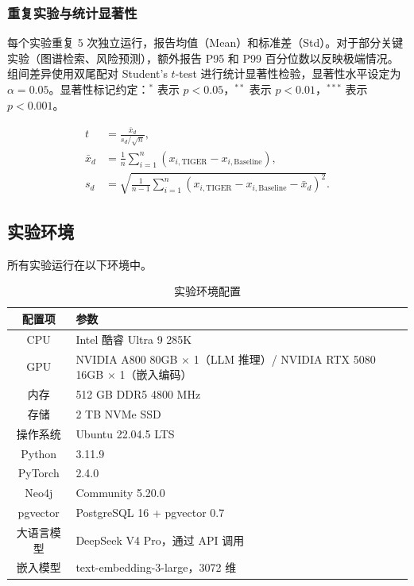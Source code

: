 \documentclass[12pt,a4paper]{article}
\begin{document}
\subsubsection{重复实验与统计显著性}

每个实验重复 5 次独立运行，报告均值（Mean）和标准差（Std）。对于部分关键实验（图谱检索、风险预测），额外报告 P95 和 P99 百分位数以反映极端情况。组间差异使用双尾配对 Student's $t$-test 进行统计显著性检验，显著性水平设定为 $\alpha=0.05$。显著性标记约定：$^{\ast}$ 表示 $p < 0.05$，$^{\ast\ast}$ 表示 $p < 0.01$，$^{\ast\ast\ast}$ 表示 $p < 0.001$。

\begin{align}
t &= \frac{\bar{x}_d}{s_d / \sqrt{n}}, \\[0.3em]
\bar{x}_d &= \frac{1}{n}\sum_{i=1}^{n}(x_{i,\text{TIGER}} - x_{i,\text{Baseline}}), \\[0.3em]
s_d &= \sqrt{\frac{1}{n-1}\sum_{i=1}^{n}(x_{i,\text{TIGER}} - x_{i,\text{Baseline}} - \bar{x}_d)^2}.
\end{align}

\subsection{实验环境}
\label{sec:exp-env}

所有实验运行在以下环境中。

\begin{table}[H]
\centering
\footnotesize
\caption{实验环境配置}
\label{tab:exp-env}
\begin{tabularx}{0.95\linewidth}{c X}
\toprule
\textbf{配置项} & \textbf{参数} \\
\midrule
CPU & Intel 酷睿 Ultra 9 285K \\
GPU & NVIDIA A800 80GB $\times$ 1（LLM 推理）/ NVIDIA RTX 5080 16GB $\times$ 1（嵌入编码） \\
内存 & 512 GB DDR5 4800 MHz \\
存储 & 2 TB NVMe SSD \\
操作系统 & Ubuntu 22.04.5 LTS \\
Python & 3.11.9 \\
PyTorch & 2.4.0 \\
Neo4j & Community 5.20.0 \\
pgvector & PostgreSQL 16 + pgvector 0.7 \\
大语言模型 & DeepSeek V4 Pro，通过 API 调用 \\
嵌入模型 & text-embedding-3-large，3072 维 \\
\bottomrule
\end{tabularx}
\end{table}
\end{document}
